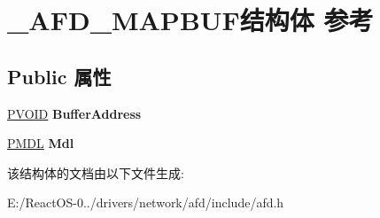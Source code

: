 \hypertarget{struct___a_f_d___m_a_p_b_u_f}{}\section{\+\_\+\+A\+F\+D\+\_\+\+M\+A\+P\+B\+U\+F结构体 参考}
\label{struct___a_f_d___m_a_p_b_u_f}
\subsection*{Public 属性}
\begin{DoxyCompactItemize}
\item 
\mbox{\label{struct___a_f_d___m_a_p_b_u_f_a4b9706650baf620eace32cf37a244e31}} 
\hyperlink{interfacevoid}{P\+V\+O\+ID} {\bfseries Buffer\+Address}
\item 
\mbox{\label{struct___a_f_d___m_a_p_b_u_f_a25ec4c81ce5e7d896997cbeb0c4b972d}} 
\hyperlink{interfacevoid}{P\+M\+DL} {\bfseries Mdl}
\end{DoxyCompactItemize}


该结构体的文档由以下文件生成\+:\begin{DoxyCompactItemize}
\item 
E\+:/\+React\+O\+S-\/0../drivers/network/afd/include/afd.\+h\end{DoxyCompactItemize}
